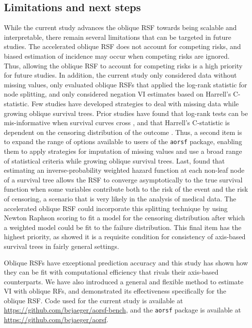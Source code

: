 \documentclass{article}\usepackage[]{graphicx}\usepackage[]{xcolor}
\begin{document}
\subsection{Limitations and next steps}

While the current study advances the oblique RSF towards being scalable and interpretable, there remain several limitations that can be targeted in future studies. The accelerated oblique RSF does not account for competing risks, and biased estimation of incidence may occur when competing risks are ignored. Thus, allowing the oblique RSF to account for competing risks is a high priority for future studies. In addition, the current study only considered data without missing values, only evaluated oblique RSFs that applied the log-rank statistic for node splitting, and only considered negation VI estimates based on Harrell's C-statistic. Few studies have developed strategies to deal with missing data while growing oblique survival trees. Prior studies have found that log-rank tests can be mis-informative when survival curves cross \citep{li2015statistical}, and that Harrell's C-statistic is dependent on the censoring distribution of the outcome \citep{uno2011c}. Thus, a second item is to expand the range of options available to users of the \texttt{aorsf} package, enabling them to apply strategies for imputation of missing values and use a broad range of statistical criteria while growing oblique survival trees. Last, \citet{cui2017consistency} found that estimating an inverse-probability weighted hazard function at each non-leaf node of a survival tree allows the RSF to converge asymptotically to the true survival function when some variables contribute both to the risk of the event and the risk of censoring, a scenario that is very likely in the analysis of medical data. The accelerated oblique RSF could incorporate this splitting technique by using Newton Raphson scoring to fit a model for the censoring distribution after which a weighted model could be fit to the failure distribution. This final item has the highest priority, as \citet{cui2017consistency} showed it is a requisite condition for consistency of axis-based survival trees in fairly general settings.


Oblique RSFs have exceptional prediction accuracy and this study has shown how they can be fit with computational efficiency that rivals their axis-based counterparts. We have also introduced a general and flexible method to estimate VI with oblique RFs, and demonstrated its effectiveness specifically for the oblique RSF. Code used for the current study is available at \href{https://github.com/bcjaeger/aorsf-bench}{https://github.com/bcjaeger/aorsf-bench}, and the \texttt{aorsf} package is available at \href{https://github.com/bcjaeger/aorsf}{https://github.com/bcjaeger/aorsf}.
\end{document}
